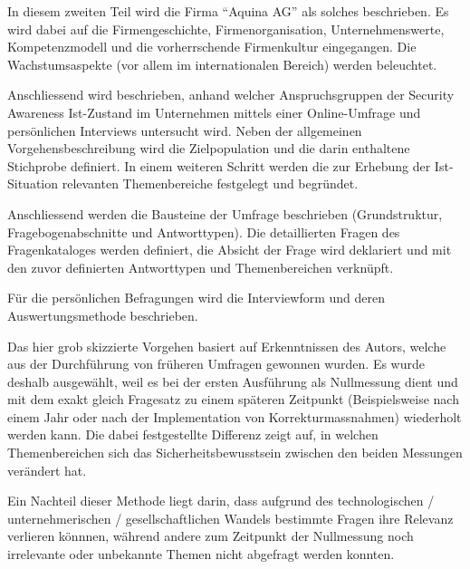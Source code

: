 \documentclass[../../main.tex]{subfiles}
\begin{document}
\begin{sloppypar}
In diesem zweiten Teil wird die Firma "`Aquina AG"' als solches beschrieben. Es wird dabei auf die Firmengeschichte, Firmenorganisation, Unternehmenswerte, Kompetenzmodell und die vorherrschende Firmenkultur eingegangen. Die Wachstumsaspekte (vor allem im internationalen Bereich) werden beleuchtet.

Anschliessend wird beschrieben, anhand welcher Anspruchsgruppen der Security Awareness Ist-Zustand im Unternehmen mittels einer Online-Umfrage und persönlichen Interviews untersucht wird. Neben der allgemeinen Vorgehensbeschreibung wird die Zielpopulation und die darin enthaltene Stichprobe definiert. In einem weiteren Schritt werden die zur Erhebung der Ist-Situation relevanten Themenbereiche festgelegt und begründet.

Anschliessend werden die Bausteine der Umfrage beschrieben (Grundstruktur, Fragebogenabschnitte und Antworttypen). Die detaillierten Fragen des Fragenkataloges werden definiert, die Absicht der Frage wird deklariert und mit den zuvor definierten Antworttypen und Themenbereichen verknüpft.

Für die persönlichen Befragungen wird die Interviewform und deren Auswertungsmethode beschrieben.

Das hier grob skizzierte Vorgehen basiert auf Erkenntnissen des Autors, welche aus der Durchführung von früheren Umfragen gewonnen wurden. Es wurde deshalb ausgewählt, weil es bei der ersten Ausführung als Nullmessung dient und mit dem exakt gleich Fragesatz zu einem späteren Zeitpunkt (Beispielsweise nach einem Jahr oder nach der Implementation von Korrekturmassnahmen) wiederholt werden kann. Die dabei festgestellte Differenz zeigt auf, in welchen Themenbereichen sich das Sicherheitsbewusstsein zwischen den beiden Messungen verändert hat.

Ein Nachteil dieser Methode liegt darin, dass aufgrund des technologischen / unternehmerischen / gesellschaftlichen Wandels bestimmte Fragen ihre Relevanz verlieren könnnen, während andere zum Zeitpunkt der Nullmessung noch irrelevante oder unbekannte Themen nicht abgefragt werden konnten.
\end{sloppypar}
\end{document}
